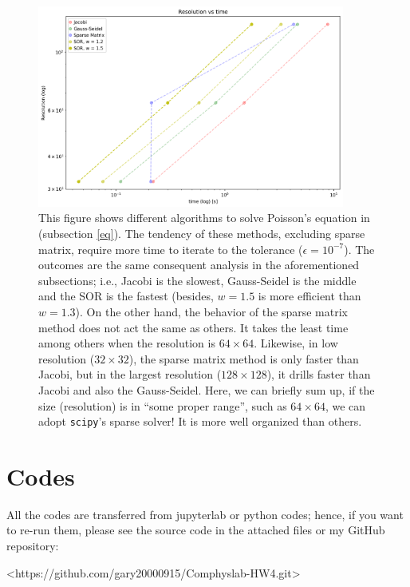 \documentclass[12pt]{article}
\begin{document}
    \begin{figure}[H]
        \centering
        \includegraphics[width = 0.9\textwidth]{./fig/4.png}
        \caption{This figure shows different algorithms to solve Poisson's equation in (subsection \ref{eq}). The tendency of these methods, excluding sparse matrix, require more time to iterate to the tolerance ($\epsilon = 10^{-7}$). The outcomes are the same consequent analysis in the aforementioned subsections; i.e., Jacobi is the slowest, Gauss-Seidel is the middle and the SOR is the fastest (besides, $w = 1.5$ is more efficient than $w = 1.3$). On the other hand, the behavior of the sparse matrix method does not act the same as others. It takes the least time among others when the resolution is $64 \times 64$. Likewise, in low resolution ($32 \times 32$), the sparse matrix method is only faster than Jacobi, but in the largest resolution ($128 \times 128$), it drills faster than Jacobi and also the Gauss-Seidel. Here, we can briefly sum up, if the size (resolution) is in ``some proper range'', such as $64 \times 64$, we can adopt \texttt{scipy}'s sparse solver! It is more well organized than others.}\label{q4}
    \end{figure}

\section{Codes}
    All the codes are transferred from jupyterlab or python codes; hence, if you want to re-run them, please see the source code in the attached files or my GitHub repository:

    {\centerline{\ttfamily <https://github.com/gary20000915/Comphyslab-HW4.git>}}
\end{document}
